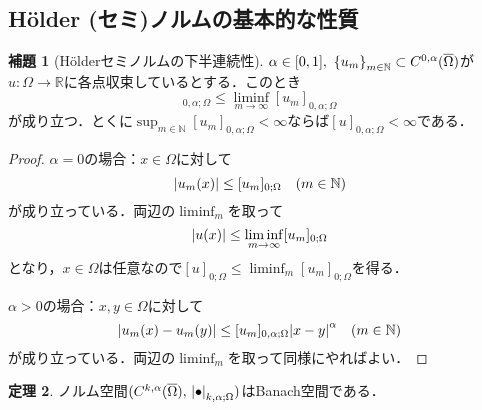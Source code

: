 \documentclass[a4paper]{ltjsarticle}
\newcommand{\Rset}{\mathbb{R}}
\newcommand{\Nset}{\mathbb{N}}
\newcommand{\Om}{\Omega}
\newcommand{\Ombar}{\overline{\Omega}}
\newcommand{\1}{\mathbbm{1}}
\numberwithin{equation}{section}
\theoremstyle{definition}
\newtheorem{thm}{定理}[section]
\newtheorem{lem}[thm]{補題}
\begin{document}
\subsection{Hölder (セミ)ノルムの基本的な性質}
\begin{lem}[Hölderセミノルムの下半連続性]\label{lem:holder_sn_lsc}
    $\alpha\in[0,1],\ \qty{u_m}_{m\in\Nset}\subset C^{0,\alpha}(\Ombar)$が$u\colon \Om\to \Rset$に各点収束しているとする．このとき
    \begin{equation}
        [u]_{0,\alpha;\Om}\leq \liminf_{m\to\infty}[u_m]_{0,\alpha;\Om}
    \end{equation}
    が成り立つ．とくに$\sup_{m\in\Nset}[u_m]_{0,\alpha;\Om}<\infty$ならば$[u]_{0,\alpha;\Om}<\infty$である．
\end{lem}
\begin{proof}
    $\alpha=0$の場合：$x\in\Om$に対して
    \begin{equation}
        \abs{u_m(x)}\leq [u_m]_{0;\Om} \quad (m\in\Nset)
    \end{equation}
    が成り立っている．両辺の$\liminf_{m}$を取って
    \begin{equation}
        \abs{u(x)}\leq \liminf_{m\to\infty}[u_m]_{0;\Om} 
    \end{equation}
    となり，$x\in\Om$は任意なので$[u]_{0;\Om}\leq \liminf_{m}[u_m]_{0;\Om}$を得る．

    $\alpha>0$の場合：$x,y\in\Om$に対して
    \begin{equation}
        \abs{u_m(x)-u_m(y)}\leq [u_m]_{0,\alpha;\Om}\abs{x-y}^\alpha \quad (m\in\Nset) 
    \end{equation}
    が成り立っている．両辺の$\liminf_m$を取って同様にやればよい．
\end{proof}
\begin{thm}
    ノルム空間$(C^{k,\alpha}(\Ombar),\,\abs{\bullet}_{k,\alpha;\Om})$はBanach空間である．
\end{thm}
\end{document}
